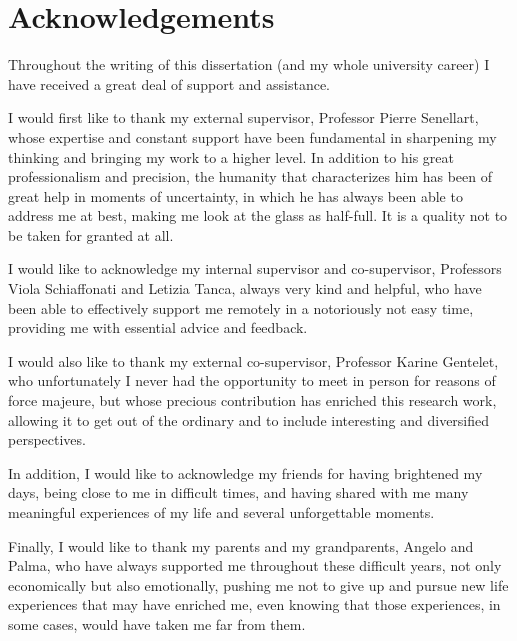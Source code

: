 \chapter*{Acknowledgements}


Throughout the writing of this dissertation (and my whole university career) I have received a great deal of support and assistance.

I would first like to thank my external supervisor, Professor Pierre Senellart, whose expertise and constant support have been fundamental in sharpening my thinking and bringing my work to a higher level. In addition to his great professionalism and precision, the humanity that characterizes him has been of great help in moments of uncertainty, in which he has always been able to address me at best, making me look at the glass as half-full. It is a quality not to be taken for granted at all.

I would like to acknowledge my internal supervisor and co-supervisor, Professors Viola Schiaffonati and Letizia Tanca, always very kind and helpful, who have been able to effectively support me remotely in a notoriously not easy time, providing me with essential advice and feedback.

I would also like to thank my external co-supervisor, Professor Karine Gentelet, who unfortunately I never had the opportunity to meet in person for reasons of force majeure, but whose precious contribution has enriched this research work, allowing it to get out of the ordinary and to include interesting and diversified perspectives.

In addition, I would like to acknowledge my friends for having brightened my days, being close to me in difficult times, and having shared with me many meaningful experiences of my life and several unforgettable moments.

Finally, I would like to thank my parents and my grandparents, Angelo and Palma, who have always supported me throughout these difficult years, not only economically but also emotionally, pushing me not to give up and pursue new life experiences that may have enriched me, even knowing that those experiences, in some cases, would have taken me far from them.
